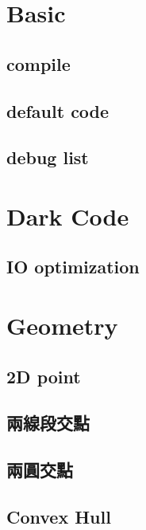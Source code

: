 \section{Basic}

\subsection{compile}

\subsection{default code}

\subsection{debug list}


\section{Dark Code}

\subsection{IO optimization}


\section{Geometry}

\subsection{2D point}

\subsection{兩線段交點}

\subsection{兩圓交點}

\subsection{Convex Hull}


